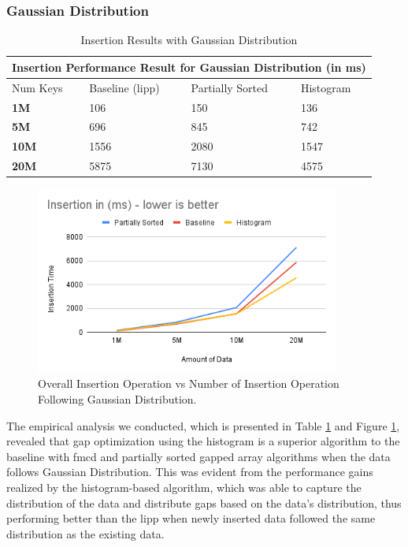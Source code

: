 \subsubsection{Gaussian Distribution} 
\begin{table} 
    \centering
    \begin{tabular}{ |p{2cm}|p{3cm}|p{3cm}|p{3cm}| } 
        
     \hline
     \multicolumn{4}{|c|}{Insertion Performance Result for Gaussian Distribution (in ms)} \\
     \hline
      Num Keys & Baseline (\acrshort{lipp})  & Partially Sorted & Histogram \\
     \hline
     \textbf{1M} & \cellcolor{green}106 & 150 & 136 \\
     \textbf{5M} & \cellcolor{green}696 & 845 & 742 \\
     \textbf{10M} & 1556 & 2080 & \cellcolor{green}1547 \\
     \textbf{20M} & 5875 & 7130 &\cellcolor{green} 4575 \\
     \hline
    
    \end{tabular}
     \caption{Insertion Results with Gaussian Distribution}
    \label{tab:InsertionResult}
\end{table}
\begin{figure}[H]
    \centering
    \includegraphics[width=100mm,scale=1]{Figures/InsertionResult.png}
    \caption{
Overall Insertion Operation vs Number of Insertion Operation Following Gaussian     Distribution.
    }
    \label{fig:GraphInsertionResult}
\end{figure}

The empirical analysis we conducted, which is presented in Table \ref{tab:InsertionResult} and Figure \ref{fig:GraphInsertionResult}, revealed that gap optimization using the histogram is a superior algorithm to the baseline with \acrshort{fmcd} \cite{LIPP} and partially sorted gapped array algorithms when the data follows Gaussian Distribution. This was evident from the performance gains realized by the histogram-based algorithm, which was able to capture the distribution of the data and distribute gaps based on the data's distribution, thus performing better than the \acrshort{lipp} when newly inserted data followed the same distribution as the existing data.

